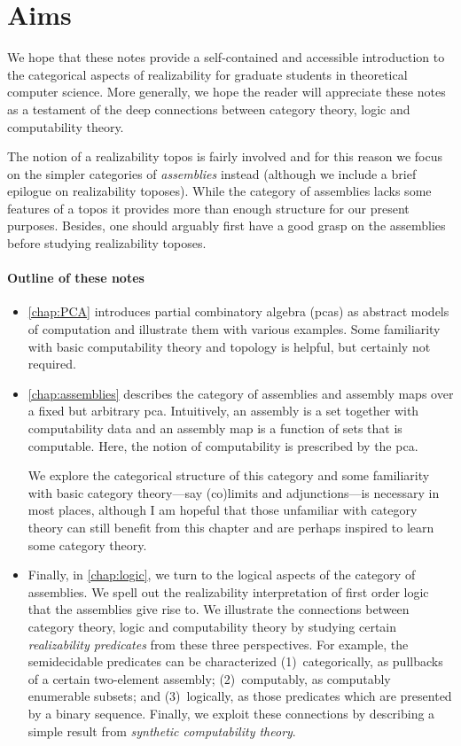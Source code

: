 \section{Aims}
We hope that these notes provide a self-contained and accessible introduction to
the categorical aspects of realizability for graduate students in theoretical
computer science.
%
More generally, we hope the reader will appreciate these notes as a testament of
the deep connections between category theory, logic and computability theory.

The notion of a realizability topos is fairly involved and for this reason we
focus on the simpler categories of \emph{assemblies} instead (although we
include a brief epilogue on realizability toposes).
%
While the category of assemblies lacks some features of a topos it provides more
than enough structure for our present purposes. Besides, one should arguably
first have a good grasp on the assemblies before studying realizability toposes.

\paragraph{Outline of these notes}
\begin{itemize}
\item \cref{chap:PCA} introduces partial combinatory algebra (pcas) as
  abstract models of computation and illustrate them with various examples.
  Some familiarity with basic computability theory and topology is
  helpful, but certainly not required.
\item \cref{chap:assemblies} describes the category of assemblies and assembly maps
  over a fixed but arbitrary pca.
  Intuitively, an assembly is a set together with computability data and an
  assembly map is a function of sets that is computable. Here, the notion of
  computability is prescribed by the pca.

  We explore the categorical structure of this category and some familiarity
  with basic category theory---say (co)limits and adjunctions---is necessary in
  most places, although I am hopeful that those unfamiliar with category theory
  can still benefit from this chapter and are perhaps inspired to learn some
  category theory.
\item
  Finally, in \cref{chap:logic}, we turn to the logical aspects of the category
  of assemblies.
  We spell out the realizability interpretation of first order logic that the
  assemblies give rise to.
  We illustrate the connections between category theory, logic and computability
  theory by studying certain \emph{realizability predicates} from these three
  perspectives. For example, the semidecidable predicates can be characterized
  (1)~categorically, as pullbacks of a certain two-element assembly;
  (2)~computably, as computably enumerable subsets; and (3)~logically, as those
  predicates which are presented by a binary sequence.
  Finally, we exploit these connections by describing a simple result from
  \emph{synthetic computability theory}.
\end{itemize}


